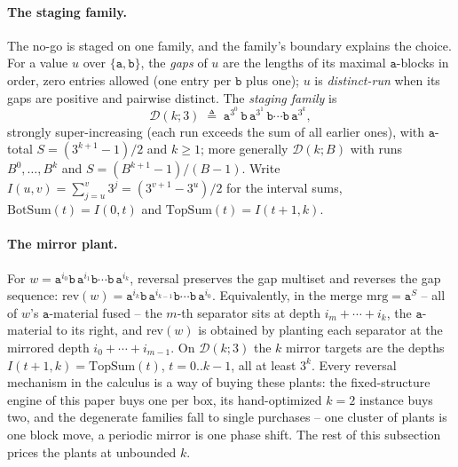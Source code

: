 \documentclass[runningheads,envcountsect]{llncs}
\begin{document}
\paragraph{The staging family.}
The no-go is staged on one family, and the family's boundary explains the choice. For a value $u$ over $\{\mathtt a, \mathtt b\}$, the \emph{gaps} of $u$ are the lengths of its maximal $\mathtt a$-blocks in order, zero entries allowed (one entry per $\mathtt b$ plus one); $u$ is \emph{distinct-run} when its gaps are positive and pairwise distinct. The \emph{staging family} is
\begin{equation*}
    \mathcal D(k;3) \;\triangleq\; \mathtt a^{3^{0}}\,\mathtt b\,\mathtt a^{3^{1}}\,\mathtt b\cdots \mathtt b\,\mathtt a^{3^{k}},
\end{equation*}
strongly super-increasing (each run exceeds the sum of all earlier ones), with $\mathtt a$-total $S = (3^{k+1}-1)/2$ and $k \ge 1$; more generally $\mathcal D(k;B)$ with runs $B^{0}, \ldots, B^{k}$ and $S = (B^{k+1}-1)/(B-1)$. Write $I(u,v) = \sum_{j=u}^{v} 3^{j} = (3^{v+1}-3^{u})/2$ for the interval sums, $\mathrm{BotSum}(t) = I(0,t)$ and $\mathrm{TopSum}(t) = I(t{+}1,k)$.

\paragraph{The mirror plant.}
For $w = \mathtt a^{i_0}\mathtt b\,\mathtt a^{i_1}\mathtt b\cdots\mathtt b\,\mathtt a^{i_k}$, reversal preserves the gap multiset and reverses the gap sequence: $\mathrm{rev}(w) = \mathtt a^{i_k}\mathtt b\,\mathtt a^{i_{k-1}}\mathtt b\cdots\mathtt b\,\mathtt a^{i_0}$. Equivalently, in the merge $\mathrm{mrg} = \mathtt a^{S}$ -- all of $w$'s $\mathtt a$-material fused -- the $m$-th separator sits at depth $i_m + \cdots + i_k$, the $\mathtt a$-material to its right, and $\mathrm{rev}(w)$ is obtained by planting each separator at the mirrored depth $i_0 + \cdots + i_{m-1}$. On $\mathcal D(k;3)$ the $k$ mirror targets are the depths $I(t{+}1,k) = \mathrm{TopSum}(t)$, $t = 0..k-1$, all at least $3^{k}$. Every reversal mechanism in the calculus is a way of buying these plants: the fixed-structure engine of this paper buys one per box, its hand-optimized $k = 2$ instance buys two, and the degenerate families fall to single purchases -- one cluster of plants is one block move, a periodic mirror is one phase shift. The rest of this subsection prices the plants at unbounded $k$.
\end{document}
